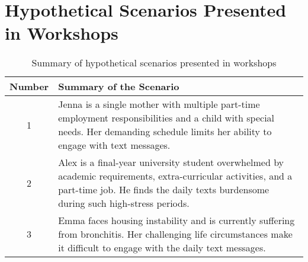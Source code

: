 \section{Hypothetical Scenarios Presented in  Workshops}
\label{app: scenarios}

\begin{table}[ht]
\caption{Summary of hypothetical scenarios presented in workshops}
\label{tab:scenario}
\begin{tabular}{|c|p{12cm}|}
\hline
\textbf{Number} & \textbf{Summary of the Scenario} \\
\hline
1 & Jenna is a single mother with multiple part-time employment responsibilities and a child with special needs. Her demanding schedule limits her ability to engage with text messages. \\
\hline
2 & Alex is a final-year university student overwhelmed by academic requirements, extra-curricular activities, and a part-time job. He finds the daily texts burdensome during such high-stress periods. \\
\hline
3 & Emma faces housing instability and is currently suffering from bronchitis. Her challenging life circumstances make it difficult to engage with the daily text messages. \\
\hline
\end{tabular}
\end{table}